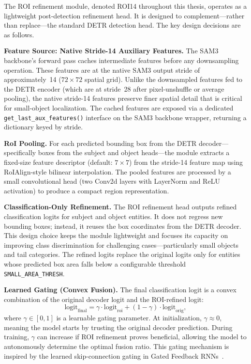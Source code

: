 The ROI refinement module, denoted ROI14 throughout this thesis, operates as a lightweight post-detection refinement head. It is designed to complement—rather than replace—the standard DETR detection head. The key design decisions are as follows.

\textbf{Feature Source: Native Stride-14 Auxiliary Features.}
The SAM3 backbone's forward pass caches intermediate features before any downsampling operation. These features are at the native SAM3 output stride of approximately~14 ($72 \times 72$ spatial grid). Unlike the downsampled features fed to the DETR encoder (which are at stride~28 after pixel-unshuffle or average pooling), the native stride-14 features preserve finer spatial detail that is critical for small-object localization. The cached features are exposed via a dedicated \texttt{get\_last\_aux\_features()} interface on the SAM3 backbone wrapper, returning a dictionary keyed by stride.

\textbf{RoI Pooling.}
For each predicted bounding box from the DETR decoder—specifically boxes from the subject and object heads—the module extracts a fixed-size feature descriptor (default: $7 \times 7$) from the stride-14 feature map using RoIAlign-style bilinear interpolation. The pooled features are processed by a small convolutional head (two Conv2d layers with LayerNorm and ReLU activation) to produce a compact region representation.

\textbf{Classification-Only Refinement.}
The ROI refinement head outputs refined classification logits for subject and object entities. It does not regress new bounding boxes; instead, it reuses the box coordinates from the DETR decoder. This design choice keeps the module lightweight and focuses its capacity on improving class discrimination for challenging cases—particularly small objects and tail categories. The refined logits replace the original logits only for entities whose predicted box area falls below a configurable threshold \texttt{SMALL\_AREA\_THRESH}.

\textbf{Learned Gating (Convex Fusion).}
The final classification logit is a convex combination of the original decoder logit and the ROI-refined logit:
\begin{equation}
\mathrm{logit}_{\mathrm{final}} = \gamma \cdot \mathrm{logit}_{\mathrm{roi}} + (1-\gamma) \cdot \mathrm{logit}_{\mathrm{orig}},
\end{equation}
where $\gamma \in [0,1]$ is a learnable gating parameter. At initialization, $\gamma \approx 0$, meaning the model starts by trusting the original decoder prediction. During training, $\gamma$ can increase if ROI refinement proves beneficial, allowing the model to autonomously determine the optimal fusion ratio. This gating mechanism is inspired by the learned skip-connection gating in Gated Feedback RNNs~\cite{chung2015gated}.

